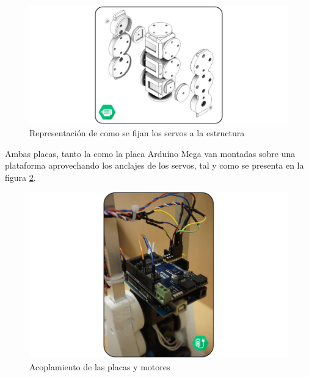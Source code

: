    	\begin{figure}[H]
   		\centering
   		\includegraphics[width=\textwidth]{figuras/Imagenes_Electronica/anclaje_servos.jpg}
   		\caption{Representación de como se fijan los servos a la estructura}
   		\label{fig:Electronica:montaje_servos}
   	\end{figure}

    Ambas placas, tanto la  como la placa Arduino Mega van montadas sobre una plataforma aprovechando los anclajes de los servos, tal y como se presenta en la figura \ref{fig:Electronica:placas}.
    \\
   	\begin{figure}[H]
   		\centering
   		\includegraphics[width=\textwidth]{figuras/Imagenes_Electronica/foto_brazo_11.jpg}
   		\caption{Acoplamiento de las placas y motores}
   		\label{fig:Electronica:placas}
   	\end{figure}
   	
